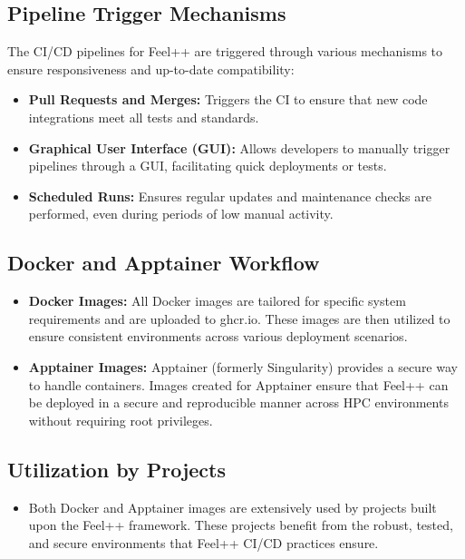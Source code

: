 \documentclass[runningheads]{llncs}
\begin{document}
\subsection{Pipeline Trigger Mechanisms}
The CI/CD pipelines for Feel++ are triggered through various mechanisms to ensure responsiveness and up-to-date compatibility:
\begin{itemize}
    \item \textbf{Pull Requests and Merges:} Triggers the CI to ensure that new code integrations meet all tests and standards.
    \item \textbf{Graphical User Interface (GUI):} Allows developers to manually trigger pipelines through a GUI, facilitating quick deployments or tests.
    \item \textbf{Scheduled Runs:} Ensures regular updates and maintenance checks are performed, even during periods of low manual activity.
\end{itemize}

\subsection{Docker and Apptainer Workflow}
\begin{itemize}
    \item \textbf{Docker Images:} All Docker images are tailored for specific system requirements and are uploaded to ghcr.io. These images are then utilized to ensure consistent environments across various deployment scenarios.
    \item \textbf{Apptainer Images:} Apptainer (formerly Singularity) provides a secure way to handle containers. Images created for Apptainer ensure that Feel++ can be deployed in a secure and reproducible manner across HPC environments without requiring root privileges.
\end{itemize}



\subsection{Utilization by Projects}
\begin{itemize}
    \item Both Docker and Apptainer images are extensively used by projects built upon the Feel++ framework. These projects benefit from the robust, tested, and secure environments that Feel++ CI/CD practices ensure.
\end{itemize}
\end{document}
